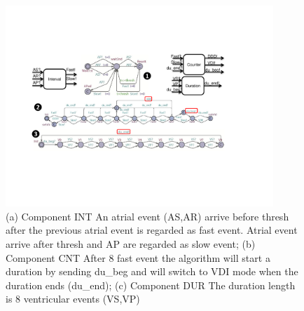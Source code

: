 \begin{figure}
		\centering
		\includegraphics[width=0.9\textwidth]{figs/duration.pdf}
		\vspace{-10pt}
		\caption{\small (a) Component \textsf{INT} An atrial event (\textsf{AS,AR}) arrive before \textsf{thresh} after the previous atrial event is regarded as \textsf{fast} event. Atrial event arrive after \textsf{thresh} and \textsf{AP} are regarded as \textsf{slow} event; (b) Component \textsf{CNT} After 8 \textsf{fast} event the algorithm will start a duration by sending \textsf{du\_beg} and will switch to \textsf{VDI} mode when the duration ends (\textsf{du\_end}); (c) Component \textsf{DUR} The duration length is 8 ventricular events (\textsf{VS,VP})}
		\label{fig:dur_count}
\end{figure} 

